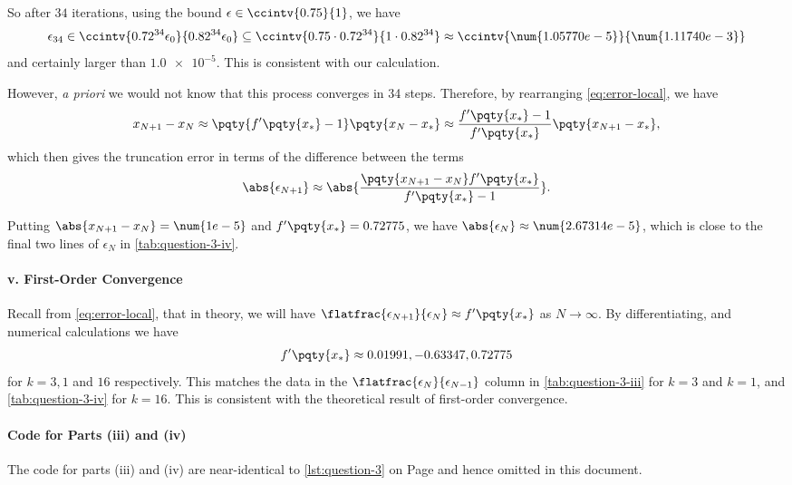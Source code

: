 \documentclass{article}
\begin{document}
So after \(34\) iterations, using the bound \(\epsilon \in \ccintv{0.75}{1}\), we have
\begin{equation}
    \epsilon_{34} \in \ccintv{0.72^{34} \epsilon_0}{0.82^{34} \epsilon_0} \subseteq \ccintv{0.75 \cdot 0.72^{34}}{1 \cdot 0.82^{34}} \approx \ccintv{\num{1.05770e-5}}{\num{1.11740e-3}}
\end{equation}
and certainly larger than \(\num{1.0e-5}\). This is consistent with our calculation.

However, \textit{a priori} we would not know that this process converges in 34 steps. Therefore, by rearranging \autoref{eq:error-local}, we have
\begin{equation}
    x_{N + 1} - x_N \approx \pqty{f'\pqty{x_{\ast}} - 1} \pqty{x_N - x_\ast} \approx \frac{f'\pqty{x_{\ast}} - 1}{f'\pqty{x_{\ast}}} \pqty{x_{N + 1} - x_{\ast}},
\end{equation}
which then gives the truncation error in terms of the difference between the terms
\begin{equation}
    \abs{\epsilon_{N + 1}} \approx \abs{\frac{\pqty{x_{N + 1} - x_N} f'\pqty{x_{\ast}}}{f'\pqty{x_{\ast}} - 1}}.
\end{equation}

Putting \(\abs{x_{N + 1} - x_N} = \num{1e-5}\) and \(f'\pqty{x_{\ast}} = 0.72775\), we have \(\abs{\epsilon_N} \approx \num{2.67314e-5}\), which is close to the final two lines of \(\epsilon_N\) in \autoref{tab:question-3-iv}.

\paragraph{v. First-Order Convergence}

Recall from \autoref{eq:error-local}, that in theory, we will have \(\flatfrac{\epsilon_{N + 1}}{\epsilon_N} \approx f'\pqty{x_\ast}\) as \(N \to \infty\). By differentiating, and numerical calculations we have
\begin{equation}
    f'\pqty{x_\ast} \approx 0.01991, -0.63347, 0.72775
\end{equation}
for \(k = 3, 1\) and \(16\) respectively. This matches the data in the \(\flatfrac{\epsilon_N}{\epsilon_{N - 1}}\) column in \autoref{tab:question-3-iii} for \(k = 3\) and \(k = 1\), and \autoref{tab:question-3-iv} for \(k = 16\). This is consistent with the theoretical result of first-order convergence.

\paragraph{Code for Parts (iii) and (iv)} The code for parts (iii) and (iv) are near-identical to \autoref{lst:question-3} on Page \pageref{lst:question-3} and hence omitted in this document.
\end{document}
